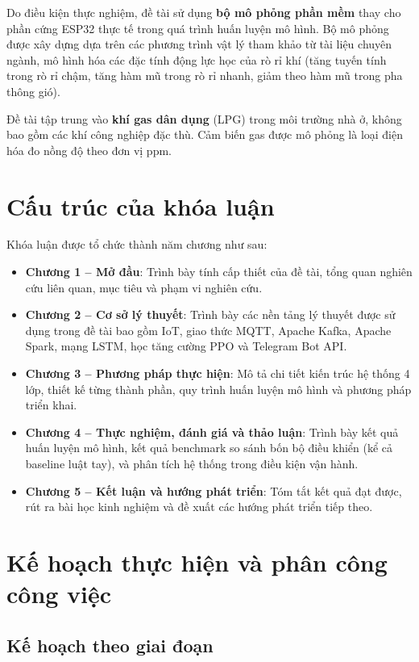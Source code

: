 Do điều kiện thực nghiệm, đề tài sử dụng \textbf{bộ mô phỏng phần mềm} thay cho phần cứng ESP32 thực tế trong quá trình huấn luyện mô hình. Bộ mô phỏng được xây dựng dựa trên các phương trình vật lý tham khảo từ tài liệu chuyên ngành, mô hình hóa các đặc tính động lực học của rò rỉ khí (tăng tuyến tính trong rò rỉ chậm, tăng hàm mũ trong rò rỉ nhanh, giảm theo hàm mũ trong pha thông gió).

Đề tài tập trung vào \textbf{khí gas dân dụng} (LPG) trong môi trường nhà ở, không bao gồm các khí công nghiệp đặc thù. Cảm biến gas được mô phỏng là loại điện hóa đo nồng độ theo đơn vị ppm.

\section{Cấu trúc của khóa luận}

Khóa luận được tổ chức thành năm chương như sau:

\begin{itemize}
  \item \textbf{Chương 1 – Mở đầu}: Trình bày tính cấp thiết của đề tài, tổng quan nghiên cứu liên quan, mục tiêu và phạm vi nghiên cứu.
  \item \textbf{Chương 2 – Cơ sở lý thuyết}: Trình bày các nền tảng lý thuyết được sử dụng trong đề tài bao gồm IoT, giao thức MQTT, Apache Kafka, Apache Spark, mạng LSTM, học tăng cường PPO và Telegram Bot API.
  \item \textbf{Chương 3 – Phương pháp thực hiện}: Mô tả chi tiết kiến trúc hệ thống 4 lớp, thiết kế từng thành phần, quy trình huấn luyện mô hình và phương pháp triển khai.
  \item \textbf{Chương 4 – Thực nghiệm, đánh giá và thảo luận}: Trình bày kết quả huấn luyện mô hình, kết quả benchmark so sánh bốn bộ điều khiển (kể cả baseline luật tay), và phân tích hệ thống trong điều kiện vận hành.
  \item \textbf{Chương 5 – Kết luận và hướng phát triển}: Tóm tắt kết quả đạt được, rút ra bài học kinh nghiệm và đề xuất các hướng phát triển tiếp theo.
\end{itemize}

\section{Kế hoạch thực hiện và phân công công việc}

\subsection*{Kế hoạch theo giai đoạn}


